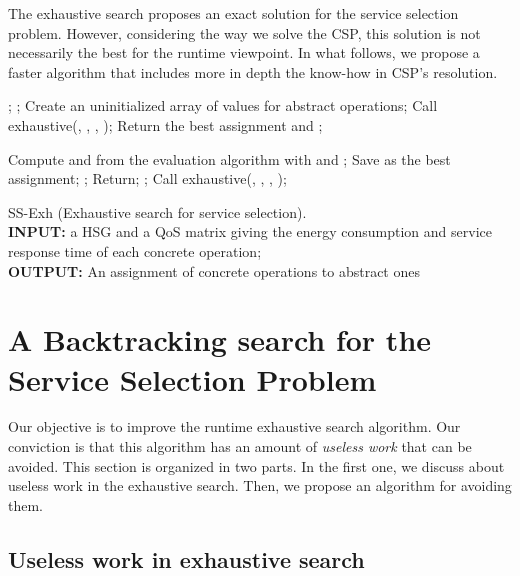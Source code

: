 \documentclass[a4paper]{article}
\begin{document}
The exhaustive search proposes an exact solution for the service selection problem. However, considering 
the way we solve the CSP, this solution is not necessarily the best for the runtime viewpoint. 
In what follows, we propose a faster algorithm that includes more in depth the know-how in CSP's resolution. 


\scriptsize
\begin{algorithm}[H]                    
\begin{algorithmic}[1]
\scriptsize
{}
        \State ;  ;
	\State Create an uninitialized array  of values for abstract operations;
	\State Call exhaustive(, , , );
	\State Return the best assignment and ;
\EndFunction

\If{}
	\State Compute  and  from the evaluation algorithm with  and ;
		\If{}
			\State Save  as the best assignment;
			\State ;
		\EndIf
	\EndIf
	\State Return;
\EndIf
{}
\State  ;
\State Call exhaustive(, , ,  );
\EndFor
\EndFunction

\normalsize
\end{algorithmic}
\caption{\scriptsize SS-Exh (Exhaustive search for service selection). \\ {\bf INPUT:} a HSG  and a QoS matrix  giving the energy consumption and 
service response time of each concrete operation;  \\ {\bf OUTPUT:} An assignment of concrete operations to abstract ones }
\label{alg:Exhaustive}  
\end{algorithm}
\normalsize


\section{A Backtracking search for the Service Selection Problem} \label{backtrackingSearch}

Our objective is to improve the runtime exhaustive search algorithm. Our conviction is that 
this algorithm has an amount of {\it useless work} that can be avoided. This section is 
organized in two parts. In the first one, we discuss about useless work in the exhaustive search. Then, we 
propose an algorithm for avoiding them. 

\subsection{Useless work in exhaustive search}
\end{document}
